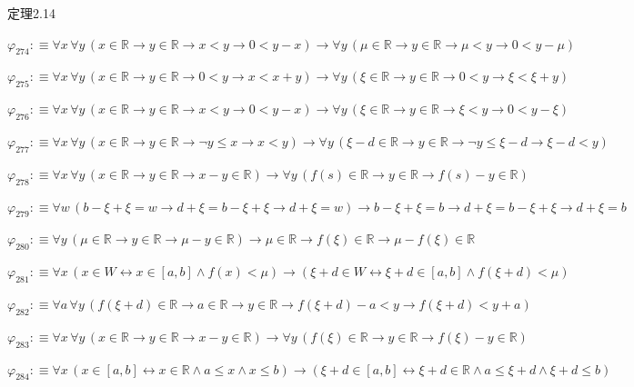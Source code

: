 \begin{fullproof}{定理2.14}
\begin{abbrevlist}
\item $\varphi_{274} :\equiv \forall x\,\forall y\,(x \in \mathbb{R} \to y \in \mathbb{R} \to x < y \to 0 < y - x) \to \forall y\,(\mu \in \mathbb{R} \to y \in \mathbb{R} \to \mu < y \to 0 < y - \mu)$
\item $\varphi_{275} :\equiv \forall x\,\forall y\,(x \in \mathbb{R} \to y \in \mathbb{R} \to 0 < y \to x < x + y) \to \forall y\,(\xi \in \mathbb{R} \to y \in \mathbb{R} \to 0 < y \to \xi < \xi + y)$
\item $\varphi_{276} :\equiv \forall x\,\forall y\,(x \in \mathbb{R} \to y \in \mathbb{R} \to x < y \to 0 < y - x) \to \forall y\,(\xi \in \mathbb{R} \to y \in \mathbb{R} \to \xi < y \to 0 < y - \xi)$
\item $\varphi_{277} :\equiv \forall x\,\forall y\,(x \in \mathbb{R} \to y \in \mathbb{R} \to \neg y \leq x \to x < y) \to \forall y\,(\xi - d \in \mathbb{R} \to y \in \mathbb{R} \to \neg y \leq \xi - d \to \xi - d < y)$
\item $\varphi_{278} :\equiv \forall x\,\forall y\,(x \in \mathbb{R} \to y \in \mathbb{R} \to x - y \in \mathbb{R}) \to \forall y\,(f(s) \in \mathbb{R} \to y \in \mathbb{R} \to f(s) - y \in \mathbb{R})$
\item $\varphi_{279} :\equiv \forall w\,(b - \xi + \xi = w \to d + \xi = b - \xi + \xi \to d + \xi = w) \to b - \xi + \xi = b \to d + \xi = b - \xi + \xi \to d + \xi = b$
\item $\varphi_{280} :\equiv \forall y\,(\mu \in \mathbb{R} \to y \in \mathbb{R} \to \mu - y \in \mathbb{R}) \to \mu \in \mathbb{R} \to f(\xi) \in \mathbb{R} \to \mu - f(\xi) \in \mathbb{R}$
\item $\varphi_{281} :\equiv \forall x\,(x \in W \leftrightarrow x \in [a,b] \land f(x) < \mu) \to (\xi + d \in W \leftrightarrow \xi + d \in [a,b] \land f(\xi + d) < \mu)$
\item $\varphi_{282} :\equiv \forall a\,\forall y\,(f(\xi + d) \in \mathbb{R} \to a \in \mathbb{R} \to y \in \mathbb{R} \to f(\xi + d) - a < y \to f(\xi + d) < y + a)$
\item $\varphi_{283} :\equiv \forall x\,\forall y\,(x \in \mathbb{R} \to y \in \mathbb{R} \to x - y \in \mathbb{R}) \to \forall y\,(f(\xi) \in \mathbb{R} \to y \in \mathbb{R} \to f(\xi) - y \in \mathbb{R})$
\item $\varphi_{284} :\equiv \forall x\,(x \in [a,b] \leftrightarrow x \in \mathbb{R} \land a \leq x \land x \leq b) \to (\xi + d \in [a,b] \leftrightarrow \xi + d \in \mathbb{R} \land a \leq \xi + d \land \xi + d \leq b)$

\end{abbrevlist}
\end{fullproof}
